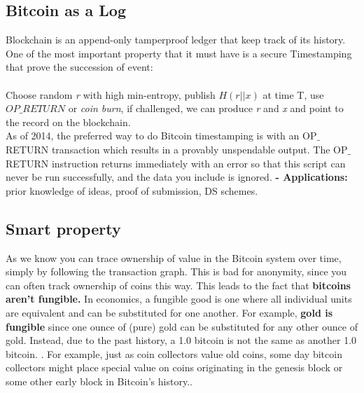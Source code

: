 \documentclass{article}
\begin{document}
\subsection{Bitcoin as a Log}
Blockchain is an append-only tamperproof ledger that keep track of its history.\\
One of the most important property that it must have is a secure Timestamping that prove the succession of event:\\\\
Choose random \textit{r} with high min-entropy, publish \textit{$H(r||x)$} at time T, use \textit{$OP\_RETURN$} or \textit{coin burn}, if challenged, we can produce \textit{r} and \textit{x} and point to the record on the blockchain.\\
As of 2014, the preferred way to do Bitcoin timestamping is with an OP$\_$RETURN transaction which results in a provably unspendable output. The OP$\_$RETURN instruction
returns immediately with an error so that this script can never be run successfully, and the data you include is ignored. 
\textbf{- Applications: }prior knowledge of ideas, proof of submission, DS schemes.
\subsection{Smart property}
As we know you can trace ownership of value in the Bitcoin system over time, simply by following the transaction graph. This is bad for anonymity, since you can often track ownership of coins this way. This leads to the fact that \textbf{bitcoins aren't fungible.} In economics, a fungible good is one where all individual units are equivalent and can be substituted for one another. For example, \textbf{gold is fungible }since one ounce of (pure) gold can be substituted for any other ounce of gold. Instead, due to the past history, a 1.0 bitcoin is not the same as another 1.0 bitcoin. . For example, just as coin collectors value old coins, some day bitcoin collectors might place special value on coins originating in the genesis block or some other early block in Bitcoin’s history..
\end{document}
